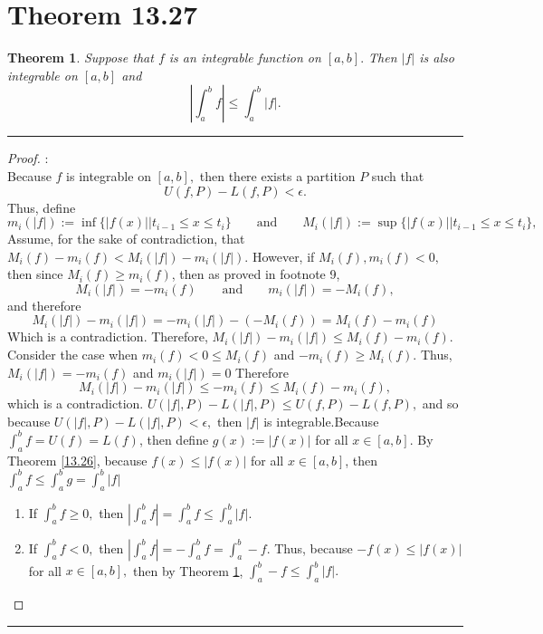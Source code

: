 \documentclass[openany, amssymb, psamsfonts]{amsart}
\newtheorem{thm}{Theorem}[section]
\theoremstyle{definition}
\numberwithin{equation}{section}
\begin{document}
\section*{Theorem 13.27}
\begin{thm}
\label{13.27}
Suppose that $f$ is an integrable function on $[a,b].$ Then $|f|$ is also integrable on $[a,b]$ and 
$$\left|\int_a^b f\right|\leq \int_a^b |f|.$$
\end{thm}
\vspace{4pt}     \hrule   \vspace{4pt}\begin{proof}:\\
Because $f$ is integrable on $[a,b],$ then there exists a partition $P$ such that \[U(f,P) - L(f,P) < \epsilon.\] Thus, define \[m_i(|f|):= \inf\{|f(x)| | t_{i-1}\leq x \leq t_i\}\qquad \text{and} \qquad M_i(|f|):= \sup\{|f(x)| | t_{i-1}\leq x \leq t_i\},\] 
Assume, for the sake of contradiction, that $M_i(f) - m_i(f)< M_i(|f|) - m_i(|f|).$ However, if $M_i(f), m_i(f)<0,$ then since $M_i(f)\geq m_i(f)$, then as proved in footnote 9, \[M_i(|f|) = -m_i(f)\qquad \text{and} \qquad m_i(|f|) = -M_i(f),\] and therefore \[M_i(|f|) - m_i(|f|) = -m_i(|f|) - (-M_i(f)) = M_i(f) - m_i(f)\]
Which is a contradiction. Therefore, $M_i(|f|) - m_i(|f|) \leq M_i(f) - m_i(f).$ Consider the case when $m_i(f)<0\leq M_i(f)$ and $-m_i(f)\geq M_i(f).$ Thus, $M_i(|f|) = -m_i(f)$ and $m_i(|f|)=0$ Therefore \[M_i(|f|) - m_i(|f|) \leq -m_i(f)\leq M_i(f) - m_i(f),\] which is a contradiction. $U(|f|,P)-L(|f|,P)\leq U(f,P)-L(f,P),$ and so because $U(|f|, P)-L(|f|,P) < \epsilon,$ then $|f|$ is integrable.\newline\newline Because $\int_a^bf = U(f) = L(f)$, then 
define $g(x):= |f(x)|$ for all $x\in [a,b].$ By Theorem \ref{13.26}, because $f(x) \leq |f(x)|$ for all $x\in [a,b]$, then $\int_a^b f \leq \int_a^bg = \int_a^b|f|$
\begin{enumerate}
    \item If $\int_a^bf \geq 0,$ then $\left|\int_a^b f\right| = \int_a^bf \leq \int_a^b|f|.$
    \item If $\int_a^bf < 0,$ then $\left|\int_a^b f\right| = -\int_a^bf = \int_a^b-f$. Thus, because $-f(x)\leq |f(x)|$ for all $x\in [a,b],$ then by Theorem \ref{13.27}, $\int_a^b-f \leq \int_a^b|f|.$ 
\end{enumerate}
\end{proof}\vspace{4pt}     \hrule   \vspace{4pt}
\end{document}
